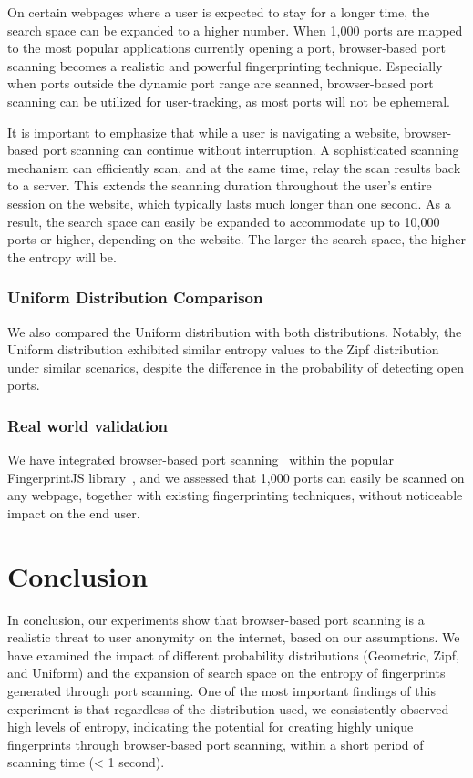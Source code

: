 On certain webpages where a user is expected to stay for a longer time, the search space can be expanded to a higher number. When 1,000 ports are mapped to the most popular applications currently opening a port, browser-based port scanning becomes a realistic and powerful fingerprinting technique. Especially when ports outside the dynamic port range are scanned, browser-based port scanning can be utilized for user-tracking, as most ports will not be ephemeral.

It is important to emphasize that while a user is navigating a website, browser-based port scanning can continue without interruption. A sophisticated scanning mechanism can efficiently scan, and at the same time, relay the scan results back to a server. This extends the scanning duration throughout the user's entire session on the website, which typically lasts much longer than one second. As a result, the search space can easily be expanded to accommodate up to 10,000 ports or higher, depending on the website. The larger the search space, the higher the entropy will be.

\subsubsection{Uniform Distribution Comparison}

We also compared the Uniform distribution with both distributions.
Notably, the Uniform distribution exhibited similar entropy values to the Zipf distribution under similar scenarios, despite the difference in the probability of detecting open ports.

\subsubsection{Real world validation}

We have integrated browser-based port scanning~ within the popular FingerprintJS library~, and we assessed that 1,000 ports can easily be scanned on any webpage, together with existing fingerprinting techniques, without noticeable impact on the end user. 


\section{Conclusion}

In conclusion, our experiments show that browser-based port scanning is a realistic threat to user anonymity on the internet, based on our assumptions. We have examined the impact of different probability distributions (Geometric, Zipf, and Uniform) and the expansion of search space on the entropy of fingerprints generated through port scanning.
One of the most important findings of this experiment is that regardless of the distribution used, we consistently observed high levels of entropy, indicating the potential for creating highly unique fingerprints through browser-based port scanning, within a short period of scanning time (< 1 second).

